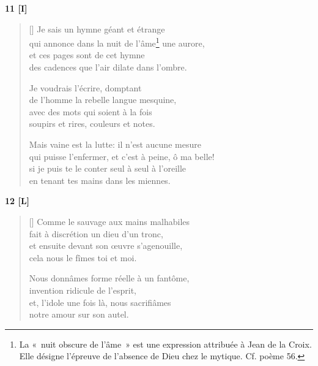 \documentclass[a4paper,12pt]{book}
\begin{document}
\bigskip

\begin{center}
  \textbf{11 [I]}
\end{center}

\settowidth{\versewidth}{qui puisse l'enfermer, et c'est à peine, ô ma belle!}

\begin{verse}[\versewidth]
  Je sais un hymne géant et étrange \\
  qui annonce dans la nuit de l'âme\footnote{La «~nuit obscure de
  l'âme~» est une expression attribuée à Jean de la Croix. Elle
  désigne l'épreuve de l'absence de Dieu chez le mytique. Cf. poème 56.} une aurore, \\
  et ces pages sont de cet hymne \\
  des cadences que l'air dilate dans l'ombre.

  Je voudrais l'écrire, domptant \\
  de l'homme la rebelle langue mesquine, \\
  avec des mots qui soient à la fois \\
  soupirs et rires, couleurs et notes.

  Mais vaine est la lutte: il n'est aucune mesure \\
  qui puisse l'enfermer, et c'est à peine, ô ma belle! \\
  si je puis te le conter seul à seul à l'oreille \\
  en tenant tes mains dans les miennes.
\end{verse}

\bigskip

\begin{center}
  \textbf{12 [L]}
\end{center}

\settowidth{\versewidth}{et, l'idole une fois là, nous sacrifiâmes}

\begin{verse}[\versewidth]
  Comme le sauvage aux mains malhabiles \\
  fait à discrétion un dieu d'un tronc, \\
  et ensuite devant son œuvre s'agenouille, \\
  cela nous le fîmes toi et moi.

  Nous donnâmes forme réelle à un fantôme, \\
  invention ridicule de l'esprit, \\
  et, l'idole une fois là, nous sacrifiâmes \\
  notre amour sur son autel.
\end{verse}
\end{document}
